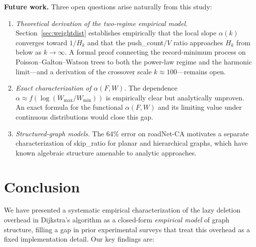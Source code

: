 \documentclass[conference]{IEEEtran}
\begin{document}
\noindent\textbf{Future work.}
Three open questions arise naturally from this study:
\begin{enumerate}
  \item \emph{Theoretical derivation of the two-regime empirical model.}
        Section~\ref{sec:weightdist} establishes empirically that the
        local slope $\alpha(k)$ converges toward $1/H_k$ and that the
        push\_count$/V$ ratio approaches $H_k$ from below as $k\to\infty$.
        A formal proof connecting the record-minimum process on
        Poisson--Galton--Watson trees to both the power-law regime and the
        harmonic limit---and a derivation of the crossover scale
        $k\approx 100$---remains open.
  \item \emph{Exact characterization of $\alpha(F,W)$.}
        The dependence $\alpha\approx f(\log(W_{\max}/W_{\min}))$
        is empirically clear but analytically unproven.  An exact formula
        for the functional $\alpha(F,W)$ and its limiting value under
        continuous distributions would close this gap.
  \item \emph{Structured-graph models.}  The 64\% error on roadNet-CA
        motivates a separate characterization of skip\_ratio for planar and
        hierarchical graphs, which have known algebraic structure amenable
        to analytic approaches.
\end{enumerate}

\section{Conclusion}
\label{sec:conclusion}

We have presented a systematic empirical characterization of the
lazy deletion overhead in Dijkstra's algorithm as a closed-form
\emph{empirical model} of graph structure, filling a gap in prior
experimental surveys that treat this overhead as a fixed implementation
detail.  Our key findings are:
\end{document}
